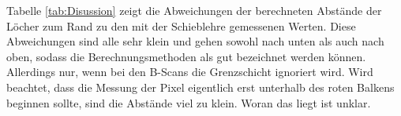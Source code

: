 Tabelle \ref{tab:Disussion} zeigt die Abweichungen der berechneten Abstände der Löcher zum Rand zu den mit der Schieblehre gemessenen Werten. Diese Abweichungen sind alle sehr klein und gehen sowohl nach unten als auch nach oben, sodass die Berechnungsmethoden als gut bezeichnet werden können. Allerdings nur, wenn bei den B-Scans die Grenzschicht ignoriert wird. Wird beachtet, dass die Messung der Pixel eigentlich erst unterhalb des roten Balkens beginnen sollte, sind die Abstände viel zu klein. Woran das liegt ist unklar.

